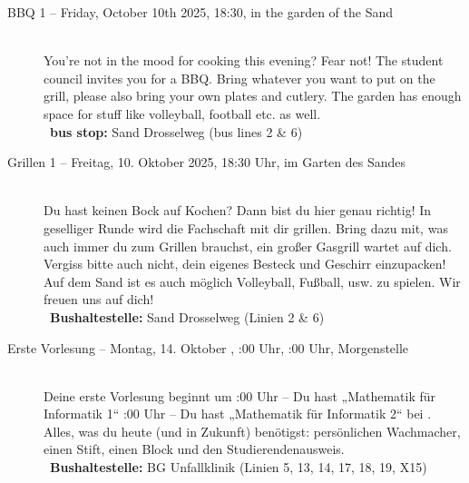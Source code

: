 \begin{description}

\ifml
    \item[BBQ 1 -- Friday, October 10th 2025, 18:30, in the garden of the Sand]~\\
    You're not in the mood for cooking this evening? Fear not!
    The student council invites you for a BBQ. Bring whatever you want to put on the grill,
    please also bring your own plates and cutlery. The garden has enough space for stuff like volleyball, football etc. as well.\\
    ~\textbf{bus stop:} Sand Drosselweg (bus lines 2 \& 6)
\else
    \item[Grillen 1 -- Freitag, 10. Oktober 2025, 18:30 Uhr, im Garten des Sandes]~\\
    Du hast keinen Bock auf Kochen? Dann bist du hier genau richtig! In geselliger Runde wird die Fachschaft mit dir grillen.
    Bring dazu mit, was auch immer du zum Grillen brauchst, ein großer Gasgrill wartet auf dich. Vergiss bitte auch nicht, dein eigenes Besteck und Geschirr einzupacken!\\
    Auf dem Sand ist es auch möglich Volleyball, Fußball, usw. zu spielen. Wir freuen uns auf dich!\\
    ~\textbf{Bushaltestelle:} Sand Drosselweg (Linien 2 \& 6)
\fi

\ifbachelor
    \item[Erste Vorlesung -- Montag, 14. Oktober \YEAR, \ifwintersemester 8:00 Uhr, \else 10:00 Uhr, \fi Morgenstelle]~\\
    Deine erste Vorlesung beginnt um
    :00 Uhr -- Du hast „Mathematik für Informatik 1“  \fi
    :00 Uhr -- Du hast „Mathematik für Informatik 2“  \fi
    bei \Matheprof.
    Alles, was du heute (und in Zukunft) benötigst: persönlichen Wachmacher, einen Stift, einen Block und den Studierendenausweis.\\
    ~\textbf{Bushaltestelle:} BG Unfallklinik (Linien 5, 13, 14, 17, 18, 19, X15)
\fi


\end{description}
